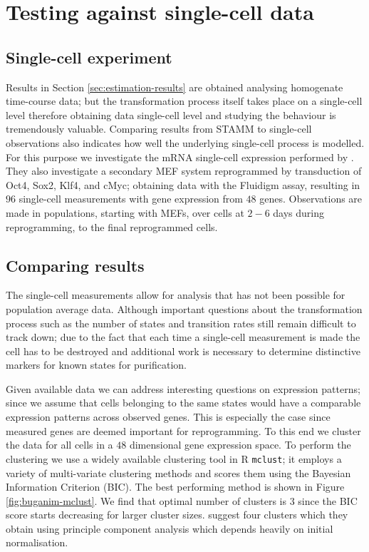 \section{Testing against single-cell data}
\label{sec:test-single-cell}

\subsection{Single-cell experiment}
\label{sec:single-cell-exper}

Results in Section \ref{sec:estimation-results} are obtained analysing homogenate time-course data; but the transformation process itself takes place on a single-cell level therefore obtaining data single-cell level and studying the behaviour is tremendously valuable. Comparing results from STAMM to single-cell observations also indicates how well the underlying single-cell process is modelled. For this purpose we investigate the mRNA single-cell expression performed by \cite{Buganim:2012hp}. They also investigate a secondary MEF system reprogrammed by transduction of Oct4, Sox2, Klf4, and cMyc; obtaining data with the Fluidigm assay, resulting in $96$ single-cell measurements with gene expression from $48$ genes. Observations are made in populations, starting with MEFs, over cells at $2 - 6$ days during reprogramming, to the final reprogrammed cells.

\subsection{Comparing results}
\label{sec:comparing-results}

The single-cell measurements \citep{Buganim:2012hp} allow for analysis that has not been possible for population average data. Although important questions about the transformation process such as the number of states and transition rates still remain difficult to track down; due to the fact that each time a single-cell measurement is made the cell has to be destroyed and additional work is necessary to determine distinctive markers for known states for purification.

Given available data we can address interesting questions on expression patterns; since we assume that cells belonging to the same states would have a comparable expression patterns across observed genes. This is especially the case since measured genes are deemed important for reprogramming. To this end we cluster the data for all cells in a $48$ dimensional gene expression space. To perform the clustering we use a widely available clustering tool in R \texttt{mclust}; it employs a variety of multi-variate clustering methods and scores them using the Bayesian Information Criterion (BIC). The best performing method is shown in Figure \ref{fig:buganim-mclust}. We find that optimal number of clusters is $3$ since the BIC score starts decreasing for larger cluster sizes. \cite{Buganim:2012hp} suggest four clusters which they obtain using principle component analysis which depends heavily on initial normalisation.

